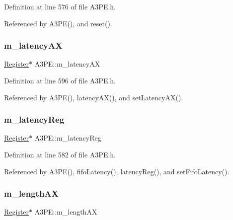 Definition at line 576 of file A3\+P\+E.\+h.



Referenced by A3\+P\+E(), and reset().

\mbox{\label{classA3PE_a061472eb539bb6ac99f4fa11a760eeaf}} 
\subsubsection{\texorpdfstring{m\+\_\+latency\+AX}{m\_latencyAX}}
{\footnotesize\ttfamily \hyperlink{classRegister}{Register}$\ast$ A3\+P\+E\+::m\+\_\+latency\+AX\hspace{0.3cm}{\ttfamily [private]}}



Definition at line 596 of file A3\+P\+E.\+h.



Referenced by A3\+P\+E(), latency\+A\+X(), and set\+Latency\+A\+X().

\mbox{\label{classA3PE_a96a167e73e264da5a18d9ddb5ebb5f23}} 
\subsubsection{\texorpdfstring{m\+\_\+latency\+Reg}{m\_latencyReg}}
{\footnotesize\ttfamily \hyperlink{classRegister}{Register}$\ast$ A3\+P\+E\+::m\+\_\+latency\+Reg\hspace{0.3cm}{\ttfamily [private]}}



Definition at line 582 of file A3\+P\+E.\+h.



Referenced by A3\+P\+E(), fifo\+Latency(), latency\+Reg(), and set\+Fifo\+Latency().

\mbox{\label{classA3PE_a87c93a38343873f2d52741deca4750ce}} 
\subsubsection{\texorpdfstring{m\+\_\+length\+AX}{m\_lengthAX}}
{\footnotesize\ttfamily \hyperlink{classRegister}{Register}$\ast$ A3\+P\+E\+::m\+\_\+length\+AX\hspace{0.3cm}{\ttfamily [private]}}



